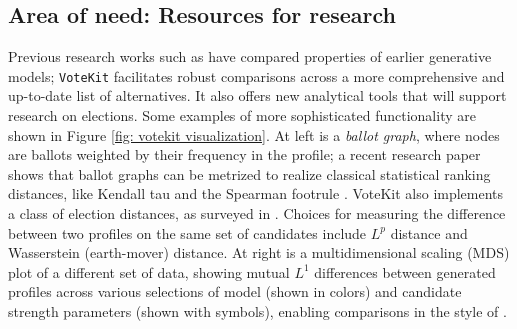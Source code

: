 \documentclass{article}
\newcommand{\VK}{{\tt VoteKit}\xspace}
\begin{document}
\FloatBarrier
\subsection{Area of need: Resources for research}

Previous research works such as \cite{elkind2017multiwinner} have compared properties of earlier generative models; \VK facilitates robust comparisons across a more comprehensive and up-to-date list of alternatives.  It also offers new analytical tools that will support research on elections.
Some examples of more sophisticated functionality are shown in Figure \ref{fig: votekit visualization}.  At left is a {\em ballot graph}, where nodes are ballots weighted by their frequency in the profile; a recent research paper shows that ballot graphs can be metrized to realize classical statistical ranking distances, like Kendall tau and the Spearman footrule \cite{duchin_tapp_24}. 
VoteKit also implements a class of election distances, as surveyed in \cite{distance-elex}.  Choices for measuring the difference between two profiles on the same set of candidates include $L^p$ distance and Wasserstein (earth-mover) distance.  
At right is a multidimensional scaling (MDS) plot of a different set of data, showing mutual $L^1$ differences between generated profiles across various selections of model (shown in colors) and candidate strength parameters (shown with symbols), enabling comparisons in the style of \cite{drawing-a-map}.  
\end{document}

